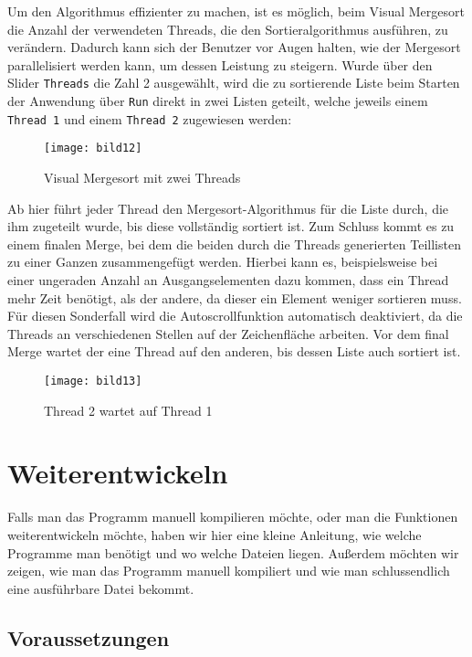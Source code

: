 Um den Algorithmus effizienter zu machen, ist es möglich, beim Visual Mergesort die Anzahl der verwendeten Threads, die den Sortieralgorithmus ausführen, zu verändern. Dadurch kann sich der Benutzer vor Augen halten, wie der Mergesort parallelisiert werden kann, um dessen Leistung zu steigern. Wurde über den Slider \texttt{Threads} die Zahl 2 ausgewählt, wird die zu sortierende Liste beim Starten der Anwendung über \texttt{Run} direkt in zwei Listen geteilt, welche jeweils einem \texttt{Thread 1} und einem \texttt{Thread 2} zugewiesen werden:

\begin{figure}[!htb]
    \centering
      \texttt{[image: bild12]}
    \caption{Visual Mergesort mit zwei Threads}
\end{figure}

Ab hier führt jeder Thread den Mergesort-Algorithmus für die Liste durch, die ihm zugeteilt wurde, bis diese vollständig sortiert ist. Zum Schluss kommt es zu einem finalen Merge, bei dem die beiden durch die Threads generierten Teillisten zu einer Ganzen zusammengefügt werden. Hierbei kann es, beispielsweise bei einer ungeraden Anzahl an Ausgangselementen dazu kommen, dass ein Thread mehr Zeit benötigt, als der andere, da dieser ein Element weniger sortieren muss. Für diesen Sonderfall wird die Autoscrollfunktion automatisch deaktiviert, da die Threads an verschiedenen Stellen auf der Zeichenfläche arbeiten. Vor dem final Merge wartet der eine Thread auf den anderen, bis dessen Liste auch sortiert ist.

\begin{figure}[!htb]
    \centering
      \texttt{[image: bild13]}
    \caption{Thread 2 wartet auf Thread 1}
\end{figure}

\clearpage
\section{Weiterentwickeln}

Falls man das Programm manuell kompilieren möchte, oder man die Funktionen weiterentwickeln möchte, haben wir hier eine kleine Anleitung, wie welche Programme man benötigt und wo welche Dateien liegen. Außerdem möchten wir zeigen, wie man das Programm manuell kompiliert und wie man schlussendlich eine ausführbare Datei bekommt.

\subsection{Voraussetzungen}


